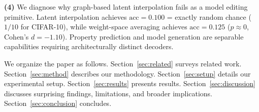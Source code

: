 \textbf{(4)} We diagnose why graph-based latent interpolation fails as a model editing primitive.
Latent interpolation achieves $\text{acc} = 0.100$ = exactly random chance ($1/10$ for CIFAR-10),
while weight-space averaging achieves $\text{acc} = 0.125$ ($p \approx 0$, Cohen's $d = -1.10$).
Property prediction and model generation are separable capabilities requiring architecturally
distinct decoders.

We organize the paper as follows.
Section~\ref{sec:related} surveys related work.
Section~\ref{sec:method} describes our methodology.
Section~\ref{sec:setup} details our experimental setup.
Section~\ref{sec:results} presents results.
Section~\ref{sec:discussion} discusses surprising findings, limitations, and broader implications.
Section~\ref{sec:conclusion} concludes.

